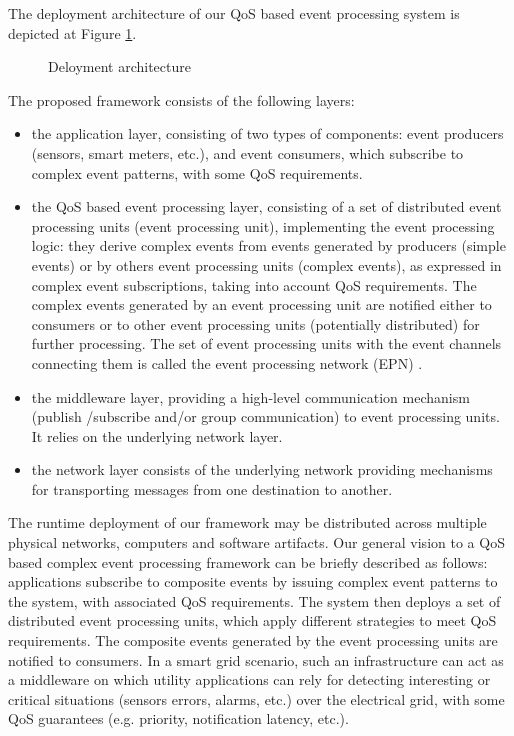\documentclass[a4paper,twoside]{article}
\begin{document}
The deployment architecture of our QoS based event processing system is depicted at Figure \ref{fig:architecture}.
\begin{figure}[!h]
  \centering
   {}
  \caption{Deloyment architecture}
  \label{fig:architecture}
 \end{figure}
 The proposed framework consists of the following layers:
\begin{itemize}
\item the application layer, consisting of two types of components: event producers (sensors, smart meters, etc.), and event consumers, which subscribe to complex event patterns, with some QoS requirements.
\item the QoS based event processing layer, consisting of a set of distributed event processing units (event processing unit), implementing the event processing logic: they derive complex events from events generated by producers (simple events) or by others event processing units (complex events), as expressed in complex event subscriptions, taking into account QoS requirements. The complex events generated by an event processing unit are notified either to consumers or to other event processing units (potentially distributed) for further processing. The set of event processing units with the event channels connecting them is called the event processing network (EPN) \cite{Luckham2011}.
\item the middleware layer, providing a high-level communication mechanism (publish /subscribe and/or group communication) to event processing units. It relies on the underlying network layer.
\item the network layer consists of the underlying network providing mechanisms for transporting messages from one destination to another.  
\end{itemize}
The runtime deployment of our framework may be distributed across multiple physical networks, computers and software artifacts.
Our general vision to a QoS based complex event processing framework can be briefly described as follows: applications subscribe to composite events by issuing complex event patterns to the system, with associated QoS requirements. The system then deploys a set of distributed event processing units, which apply different strategies to meet QoS requirements. The composite events generated by the event processing units are notified to consumers. In a smart grid scenario, such an infrastructure can act as a middleware on which utility applications can rely for detecting interesting or critical situations (sensors errors, alarms, etc.) over the electrical grid, with some QoS guarantees (e.g. priority, notification latency, etc.).
\end{document}
